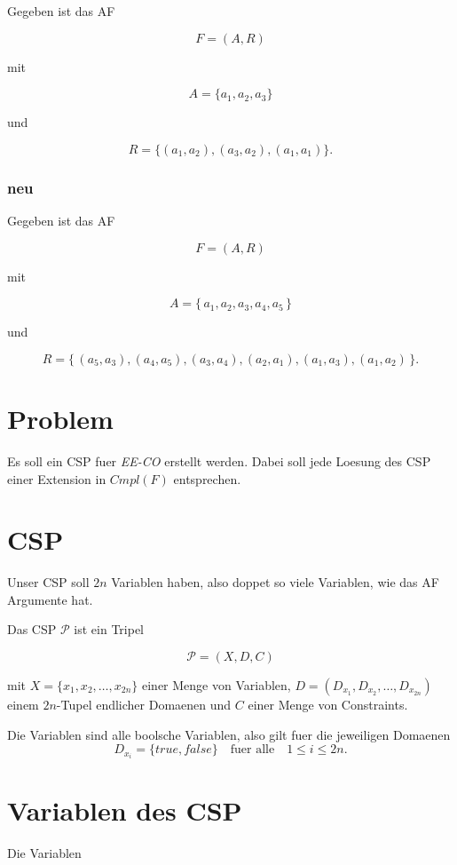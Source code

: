 \documentclass[]{article}
\begin{document}
Gegeben ist das AF

\[ F = (A,R) \]

mit

\[ A = \{a_1,a_2,a_3\} \]

und

\[ R = \{(a_1,a_2), (a_3,a_2), (a_1,a_1)\} .\]

\subsubsection{neu}\label{neu}

Gegeben ist das AF

\[ F = (A,R) \]

mit

\[ A = \{\,a_1,a_2,a_3,a_4,a_5\,\} \]

und

\[ R = \{\,(a_5,a_3),(a_4,a_5),(a_3,a_4),(a_2,a_1),(a_1,a_3),(a_1,a_2)\,\} .\]

\section{Problem}\label{problem}

Es soll ein CSP fuer \emph{EE-CO} erstellt werden. Dabei soll jede
Loesung des CSP einer Extension in $Cmpl(F)$ entsprechen.

\section{CSP}\label{csp}

Unser CSP soll $2n$ Variablen haben, also doppet so viele Variablen, wie
das AF Argumente hat.

Das CSP $\mathscr{P}$ ist ein Tripel

\[ \mathscr{P} = (X,D,C) \]

mit $X = \{x_1,x_2,\dots,x_{2n}\} $ einer Menge von Variablen,
$D = (D_{x_1},D_{x_2},\dots,D_{x_{2n}}) $ einem $2n$-Tupel endlicher
Domaenen und $C$ einer Menge von Constraints.

Die Variablen sind alle boolsche Variablen, also gilt fuer die
jeweiligen Domaenen
\[ D_{x_i} = \{true, false\} \quad\text{fuer alle}\quad 1\leq i \leq 2n .\]

\section{Variablen des CSP}\label{variablen-des-csp}

Die Variablen
\end{document}
